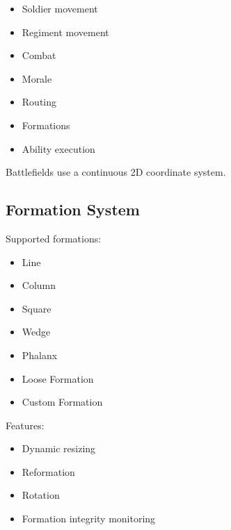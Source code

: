 \documentclass[11pt,a4paper]{article}
\begin{document}
\begin{itemize}

    \item Soldier movement

    \item Regiment movement

    \item Combat

    \item Morale

    \item Routing

    \item Formations

    \item Ability execution

\end{itemize}

Battlefields use a continuous 2D coordinate system.

\subsection{Formation System}

Supported formations:

\begin{itemize}

    \item Line

    \item Column

    \item Square

    \item Wedge

    \item Phalanx

    \item Loose Formation

    \item Custom Formation

\end{itemize}

Features:

\begin{itemize}

    \item Dynamic resizing

    \item Reformation

    \item Rotation

    \item Formation integrity monitoring

\end{itemize}
\end{document}
